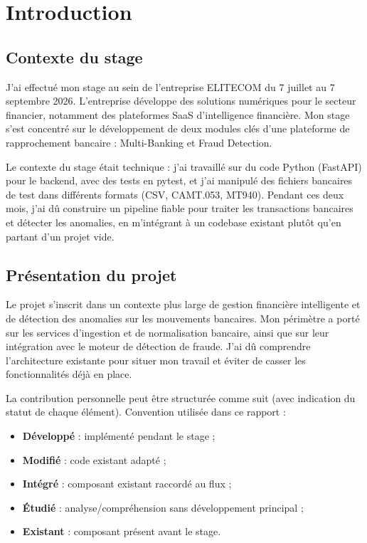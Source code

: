 \documentclass[12pt,a4paper]{extreport}
\begin{document}

\pagestyle{fancy}
\clearpage
{}

\begingroup
\let\clearpage\relax
\let\cleardoublepage\relax
\chapter{Introduction}
\endgroup

\section{Contexte du stage}

J'ai effectué mon stage au sein de l'entreprise ELITECOM du 7 juillet au 7 septembre 2026. L'entreprise développe des solutions numériques pour le secteur financier, notamment des plateformes SaaS d'intelligence financière. Mon stage s'est concentré sur le développement de deux modules clés d'une plateforme de rapprochement bancaire : Multi-Banking et Fraud Detection.

Le contexte du stage était technique : j'ai travaillé sur du code Python (FastAPI) pour le backend, avec des tests en pytest, et j'ai manipulé des fichiers bancaires de test dans différents formats (CSV, CAMT.053, MT940). Pendant ces deux mois, j'ai dû construire un pipeline fiable pour traiter les transactions bancaires et détecter les anomalies, en m'intégrant à un codebase existant plutôt qu'en partant d'un projet vide.

\section{Présentation du projet}

Le projet s'inscrit dans un contexte plus large de gestion financière intelligente et de détection des anomalies sur les mouvements bancaires. Mon périmètre a porté sur les services d'ingestion et de normalisation bancaire, ainsi que sur leur intégration avec le moteur de détection de fraude. J'ai dû comprendre l'architecture existante pour situer mon travail et éviter de casser les fonctionnalités déjà en place.

La contribution personnelle peut être structurée comme suit (avec indication du statut de chaque élément). Convention utilisée dans ce rapport :
\begin{itemize}
    \item \textbf{Développé} : implémenté pendant le stage ;
    \item \textbf{Modifié} : code existant adapté ;
    \item \textbf{Intégré} : composant existant raccordé au flux ;
    \item \textbf{Étudié} : analyse/compréhension sans développement principal ;
    \item \textbf{Existant} : composant présent avant le stage.
\end{itemize}
\end{document}
